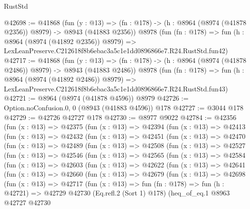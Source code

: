 \begin{lexlean}{RustStd}
\begin{coremodule}
@42698 := @41868
    (fun (y : @13) =>
    (fn : @178) -> (h : @8964 (@8974 (@41878 @2356)) @8979) -> @8943 (@41883 @2356))
    @8978
    (fun (fn : @178) =>
    fun (h : @8964 (@8974 (@41892 @2356)) @8979) =>
    LexLeanPreserve.C212618f8b6ebac3a5c1e1dd0896866e7.R24.RustStd.fun42)
@42717 := @41868
    (fun (y : @13) =>
    (fn : @178) -> (h : @8964 (@8974 (@41878 @2486)) @8979) -> @8943 (@41883 @2486))
    @8978
    (fun (fn : @178) =>
    fun (h : @8964 (@8974 (@41892 @2486)) @8979) =>
    LexLeanPreserve.C212618f8b6ebac3a5c1e1dd0896866e7.R24.RustStd.fun43)
@42721 := @8964 (@8974 (@41878 @4596)) @8979
@42726 := Option.noConfusion.{0, 0} (@8943 (@41883 @4596)) @178
@42727 := @3044 @178
@42729 := @42726 @42727 @178
@42730 := @8977 @9022
@42784 := @42356
    (fun (x : @13) =>
    @42375
      (fun (x : @13) =>
      @42394
        (fun (x : @13) =>
        @42413
          (fun (x : @13) =>
          @42432
            (fun (x : @13) =>
            @42451
              (fun (x : @13) =>
              @42470
                (fun (x : @13) =>
                @42489
                  (fun (x : @13) =>
                  @42508
                    (fun (x : @13) =>
                    @42527
                      (fun (x : @13) =>
                      @42546
                        (fun (x : @13) =>
                        @42565
                          (fun (x : @13) =>
                          @42584
                            (fun (x : @13) =>
                            @42603
                              (fun (x : @13) =>
                              @42622
                                (fun (x : @13) =>
                                @42641
                                  (fun (x : @13) =>
                                  @42660
                                    (fun (x : @13) =>
                                    @42679
                                      (fun (x : @13) =>
                                      @42698
                                        (fun (x : @13) =>
                                        @42717
                                          (fun (x : @13) =>
                                          fun (fn : @178) =>
                                          fun (h : @42721) =>
                                          @42729
                                            @42730
                                            (Eq.refl.{2} (Sort 1) @178)
                                            (heq_of_eq.{1}
                                              @8963
                                              @42727
                                              @42730

\end{coremodule}
\end{lexlean}
